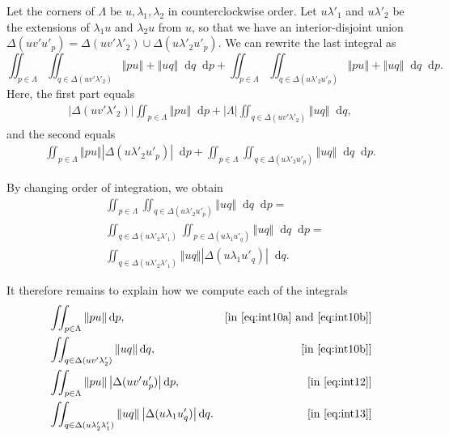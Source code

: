 \documentclass{article}
\newcommand*\diff{\mathop{}\!\mathrm{d}}
\begin{document}
Let the corners of $\Lambda$ be $u,\lambda_1,\lambda_2$ in counterclockwise order.
Let $u\lambda'_1$ and $u\lambda'_2$ be the extensions of $\lambda_1u$ and $\lambda_2u$ from $u$, so that we have an interior-disjoint union $\Delta(uv'u'_p)=\Delta(uv'\lambda'_2)\cup \Delta(u\lambda'_2u'_p)$.
We can rewrite the last integral as
\[
\iint_{p\in \Lambda} \iint_{q\in \Delta(uv'\lambda'_2)} \left\Vert pu\right\Vert+\left\Vert uq\right\Vert \diff q\diff p +
\iint_{p\in \Lambda} \iint_{q\in \Delta(u\lambda'_2u'_p)} \left\Vert pu\right\Vert+\left\Vert uq\right\Vert \diff q\diff p.
\]
 Here, the first part equals
\begin{align}
\left\vert \Delta(uv'\lambda'_2)\right\vert \iint_{p\in \Lambda} \left\Vert pu\right\Vert \diff p
+
\left\vert \Lambda \right\vert \iint_{q\in \Delta(uv'\lambda'_2)} \left\Vert uq\right\Vert \diff q, \label{eq:int10b}
\end{align}
and the second equals
\begin{align}
\iint_{p\in \Lambda} \left\Vert pu\right\Vert \left\vert \Delta(u\lambda'_2u'_p)\right\vert \diff p
+\iint_{p\in \Lambda} \iint_{q\in \Delta(u\lambda'_2u'_p)} \left\Vert uq\right\Vert \diff q\diff p. \label{eq:int12}
\end{align}

By changing order of integration, we obtain
\begin{align}
& \iint_{p\in \Lambda} \iint_{q\in \Delta(u\lambda'_2u'_p)} \left\Vert uq\right\Vert \diff q\diff p= \nonumber\\
& \iint_{q\in \Delta(u\lambda'_2\lambda'_1)} \iint_{p\in \Delta(u\lambda_1 u'_q)} \left\Vert uq\right\Vert \diff q\diff p= \nonumber\\
& \iint_{q\in \Delta(u\lambda'_2\lambda'_1)}  \left\Vert uq\right\Vert \left\vert \Delta(u\lambda_1 u'_q)\right\vert \diff q. \label{eq:int13}
\end{align}

It therefore remains to explain how we compute each of the integrals
\begin{align}
&\iint_{p\in \Lambda} \left\Vert pu\right\Vert \diff p, & \textrm{[in \eqref{eq:int10a} and \eqref{eq:int10b}]} \label{eq:triint1} \\
&\iint_{q\in \Delta(uv'\lambda'_2)} \left\Vert uq\right\Vert \diff q, & \textrm{[in \eqref{eq:int10b}]} \label{eq:triint1a}\\
&\iint_{p\in \Lambda} \left\Vert pu\right\Vert \left\vert \Delta(uv'u'_p)\right\vert \diff p, & \textrm{[in \eqref{eq:int12}]} \label{eq:triint2}\\
&\iint_{q\in \Delta(u\lambda'_2\lambda'_1)} \left\Vert uq\right\Vert \left\vert \Delta(u\lambda_1 u'_q)\right\vert \diff q.  & \textrm{[in \eqref{eq:int13}]} \label{eq:triint3}
\end{align}
\end{document}
